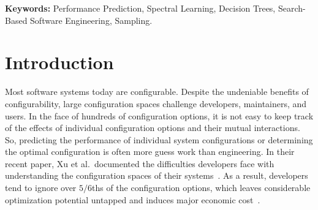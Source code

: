 \documentclass{newsig}
\begin{document}
 
\noindent
{\bf Keywords:} Performance Prediction, 
Spectral Learning, 
Decision Trees,
Search-Based Software Engineering, 
Sampling.
 

 
\section{Introduction}
 

Most software systems today are configurable. Despite the undeniable benefits
of configurability, large configuration spaces challenge developers, maintainers, and users. In the face of hundreds of configuration options, it is not easy to keep track of the effects of individual configuration options and their mutual interactions. So, predicting the performance of individual system configurations or determining the optimal configuration is often more guess work than engineering. In their recent paper, Xu et al.\ documented the  difficulties developers face
with understanding  the configuration spaces of their systems~\cite{xu2015hey}. As a result, developers tend to ignore over $5/6$ths of the configuration options, which leaves considerable optimization potential untapped and induces major economic cost~\cite{xu2015hey}.
\end{document}
